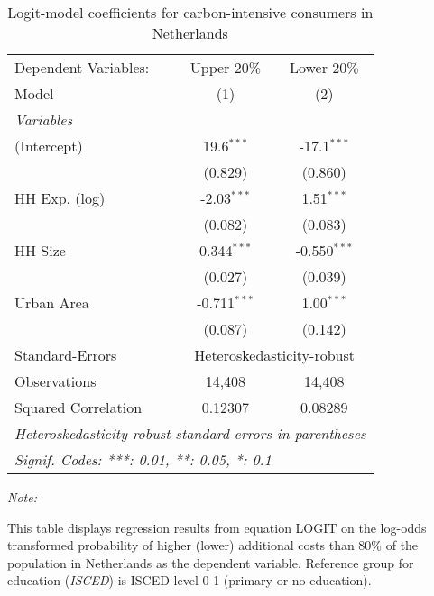 
\begin{table}[htbp!]
   \centering
   \small
   \begin{adjustbox}{width = 1\textwidth, max height = 0.95\textheight, center}
      \begin{threeparttable}[b]
         \caption{\label{tab:Logit_1_NLD} Logit-model coefficients for carbon-intensive consumers in Netherlands}
         \begin{tabular}{lcc}
            \tabularnewline \midrule \midrule
            Dependent Variables: & Upper 20\%     & Lower 20\%\\   
            Model                & (1)            & (2)\\  
            \midrule
            \emph{Variables}\\
            (Intercept)          & 19.6$^{***}$   & -17.1$^{***}$\\   
                                 & (0.829)        & (0.860)\\   
            HH Exp. (log)        & -2.03$^{***}$  & 1.51$^{***}$\\   
                                 & (0.082)        & (0.083)\\   
            HH Size              & 0.344$^{***}$  & -0.550$^{***}$\\   
                                 & (0.027)        & (0.039)\\   
            Urban Area           & -0.711$^{***}$ & 1.00$^{***}$\\   
                                 & (0.087)        & (0.142)\\   
            \midrule 
            Standard-Errors & \multicolumn{2}{c}{Heteroskedasticity-robust} \\ 
            Observations         & 14,408         & 14,408\\  
            Squared Correlation  & 0.12307        & 0.08289\\  
            \midrule \midrule
            \multicolumn{3}{l}{\emph{Heteroskedasticity-robust standard-errors in parentheses}}\\
            \multicolumn{3}{l}{\emph{Signif. Codes: ***: 0.01, **: 0.05, *: 0.1}}\\
         \end{tabular}
         
         \begin{tablenotes}\item \medskip \textit{Note:}
            \item This table displays regression results from equation LOGIT on the log-odds transformed probability of higher (lower) additional costs than 80\% of the population in Netherlands as the dependent variable. Reference group for education (\textit{ISCED}) is ISCED-level 0-1 (primary or no education).
         \end{tablenotes}
      \end{threeparttable}
   \end{adjustbox}
\end{table}


